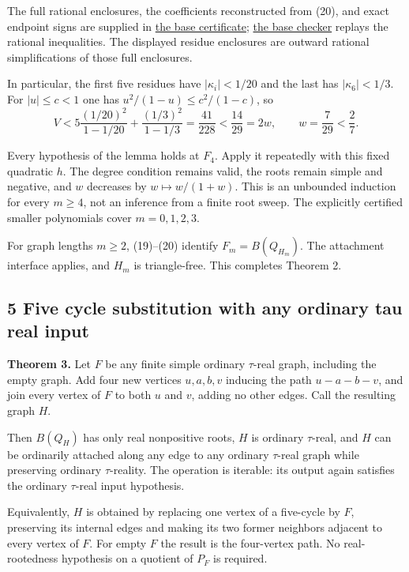 \documentclass[
  11pt,
  a4paper,
]{article}
\begin{document}
The full rational enclosures, the coefficients reconstructed from (20),
and exact endpoint signs are supplied in
\href{theta222m_exact_base.json}{the base certificate};
\href{theta222m_exact_base.py}{the base checker} replays the rational
inequalities. The displayed residue enclosures are outward rational
simplifications of those full enclosures.

In particular, the first five residues have \(|\kappa_i|<1/20\) and the
last has \(|\kappa_6|<1/3\). For \(|u|\leq c<1\) one has
\(u^2/(1-u)\leq c^2/(1-c)\), so
\nopagebreak
\[
V<5\frac{(1/20)^2}{1-1/20}+\frac{(1/3)^2}{1-1/3}
=\frac{41}{228}<\frac{14}{29}=2w,\qquad
w=\frac7{29}<\frac27.\tag{29}
\]

Every hypothesis of the lemma holds at \(F_4\). Apply it repeatedly with
this fixed quadratic \(h\). The degree condition remains valid, the
roots remain simple and negative, and \(w\) decreases by
\(w\mapsto w/(1+w)\). This is an unbounded induction for every
\(m\geq4\), not an inference from a finite root sweep. The explicitly
certified smaller polynomials cover \(m=0,1,2,3\).

For graph lengths \(m\geq2\), (19)--(20) identify \(F_m=B(Q_{H_m})\).
The attachment interface applies, and \(H_m\) is triangle-free. This
completes Theorem 2.

\subsection{5 Five cycle substitution with any ordinary tau real
input}\label{five-cycle-substitution-with-any-ordinary-tau-real-input}

\textbf{Theorem 3.} Let \(F\) be any finite simple ordinary
\(\tau\)-real graph, including the empty graph. Add four new vertices
\(u,a,b,v\) inducing the path \(u-a-b-v\), and join every vertex of
\(F\) to both \(u\) and \(v\), adding no other edges. Call the resulting
graph \(H\).

Then \(B(Q_H)\) has only real nonpositive roots, \(H\) is ordinary
\(\tau\)-real, and \(H\) can be ordinarily attached along any edge to
any ordinary \(\tau\)-real graph while preserving ordinary
\(\tau\)-reality. The operation is iterable: its output again satisfies
the ordinary \(\tau\)-real input hypothesis.

Equivalently, \(H\) is obtained by replacing one vertex of a five-cycle
by \(F\), preserving its internal edges and making its two former
neighbors adjacent to every vertex of \(F\). For empty \(F\) the result
is the four-vertex path. No real-rootedness hypothesis on a quotient of
\(P_F\) is required.
\end{document}
